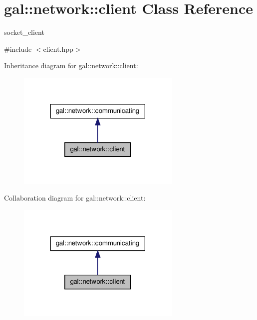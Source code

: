 \hypertarget{classgal_1_1network_1_1client}{\section{gal\-:\-:network\-:\-:client \-Class \-Reference}
\label{classgal_1_1network_1_1client}
}


socket\-\_\-client  




{\ttfamily \#include $<$client.\-hpp$>$}



\-Inheritance diagram for gal\-:\-:network\-:\-:client\-:
\nopagebreak
\begin{figure}[H]
\begin{center}
\leavevmode
\includegraphics[width=222pt]{classgal_1_1network_1_1client__inherit__graph}
\end{center}
\end{figure}


\-Collaboration diagram for gal\-:\-:network\-:\-:client\-:
\nopagebreak
\begin{figure}[H]
\begin{center}
\leavevmode
\includegraphics[width=222pt]{classgal_1_1network_1_1client__coll__graph}
\end{center}
\end{figure}
